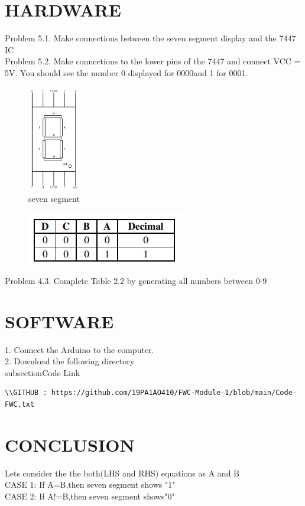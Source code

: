 \documentclass[10pt, a4paper]{article}
\begin{document}
\section{HARDWARE}
Problem 5.1. Make connections between the seven segment display  and the 7447 IC
\\Problem 5.2. Make connections to the lower pins of the 7447  and connect VCC = 5V. You should see the number 0 displayed for 0000and 1 for 0001.


\begin{figure}[h]
    \centering
    \includegraphics[width=0.2\textwidth]{7segpo.jpg}
    \caption{seven segment}
    \label{fig:my_label}
\end{figure}


\begin{figure}[h]
    \centering
    \includegraphics{decimal.jpg}
    \caption{}
\end{figure}  
  
Problem 4.3. Complete Table 2.2 by generating all
numbers between 0-9
\section{SOFTWARE}

1. Connect the Arduino to the computer.
\\2. Download the following directory
\\subsection{Code Link} 
\vspace{5mm} 
\begin{lstlisting} 
\\GITHUB : https://github.com/19PA1AO410/FWC-Module-1/blob/main/Code-FWC.txt
\end{lstlisting} 

\section{CONCLUSION}
Lets consider the the both(LHS and RHS) equations as A and B
\\CASE 1: If A=B,then seven segment shows "1"
\\CASE 2: If A!=B,then seven segment shows"0"
\end{document}
